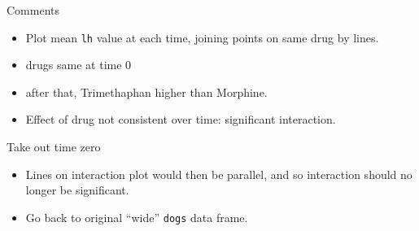 \begin{frame}[fragile]{Comments}
  

\begin{itemize}
\item Plot mean \texttt{lh} value at each time, joining points on same
  drug by lines.
\item drugs same at time 0
\item after that, Trimethaphan higher than Morphine.
\item Effect of drug not consistent over time: significant interaction.
\end{itemize}

\end{frame}



\begin{frame}[fragile]{Take out time zero}

  \begin{itemize}
  \item Lines on interaction plot would then be parallel, and so interaction should
no longer be significant.
\item Go back to original ``wide'' \texttt{dogs} data frame.
  \end{itemize}
  

 
\begin{knitrout}
\color{fgcolor}\begin{kframe}
\begin{alltt}
\hlkwb{=} 
\hlkwb{=}\hlopt{~}
\hlkwb{=}
\hlkwb{=}
\hlkwb{=}\hlopt{::}
                   \hlstd{=}\hlopt{~}
\end{alltt}
\end{kframe}
\end{knitrout}


\end{frame}

